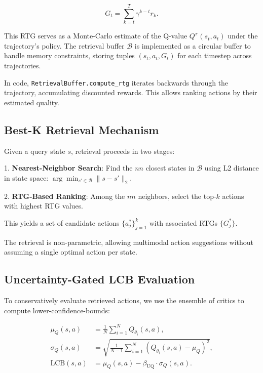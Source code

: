 \documentclass[11pt,a4paper]{article}
\begin{document}
\begin{equation}
G_t = \sum_{k=t}^{T} \gamma^{k-t} r_k.
\label{eq:rtg}
\end{equation}

This RTG serves as a Monte-Carlo estimate of the Q-value $Q^\pi(s_t, a_t)$ under the trajectory's policy. The retrieval buffer $\mathcal{B}$ is implemented as a circular buffer to handle memory constraints, storing tuples $(s_t, a_t, G_t)$ for each timestep across trajectories.

In code, \texttt{RetrievalBuffer.compute\_rtg} iterates backwards through the trajectory, accumulating discounted rewards. This allows ranking actions by their estimated quality.

\subsection{Best-K Retrieval Mechanism}
\label{subsec:retrieval}

Given a query state $s$, retrieval proceeds in two stages:

1. \textbf{Nearest-Neighbor Search}: Find the $nn$ closest states in $\mathcal{B}$ using L2 distance in state space: $\arg\min_{s' \in \mathcal{B}} \|s - s'\|_2$.

2. \textbf{RTG-Based Ranking}: Among the $nn$ neighbors, select the top-$k$ actions with highest RTG values.

This yields a set of candidate actions $\{a_j^*\}_{j=1}^k$ with associated RTGs $\{G_j^*\}$.

The retrieval is non-parametric, allowing multimodal action suggestions without assuming a single optimal action per state.

\subsection{Uncertainty-Gated LCB Evaluation}
\label{subsec:uncertainty}

To conservatively evaluate retrieved actions, we use the ensemble of critics to compute lower-confidence-bounds:

\begin{align}
\mu_Q(s,a) &= \frac{1}{N} \sum_{i=1}^N Q_{\theta_i}(s,a), \\
\sigma_Q(s,a) &= \sqrt{\frac{1}{N-1} \sum_{i=1}^N (Q_{\theta_i}(s,a) - \mu_Q)^2}, \\
\mathrm{LCB}(s,a) &= \mu_Q(s,a) - \beta_{\mathrm{UQ}} \cdot \sigma_Q(s,a).
\end{align}
\end{document}
